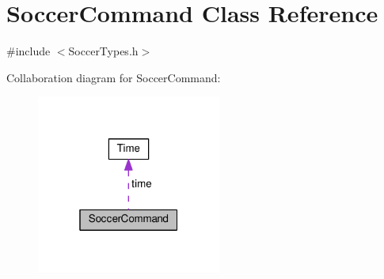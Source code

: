 \hypertarget{classSoccerCommand}{}\section{Soccer\+Command Class Reference}
\label{classSoccerCommand}


{\ttfamily \#include $<$Soccer\+Types.\+h$>$}



Collaboration diagram for Soccer\+Command\+:
\nopagebreak
\begin{figure}[H]
\begin{center}
\leavevmode
\includegraphics[width=172pt]{classSoccerCommand__coll__graph}
\end{center}
\end{figure}

